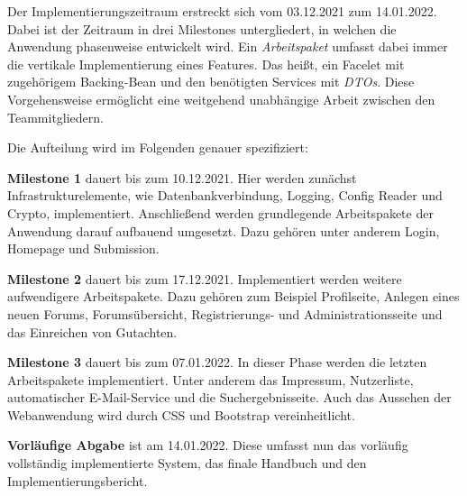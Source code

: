 
Der Implementierungszeitraum erstreckt sich vom 03.12.2021 zum 14.01.2022.
Dabei ist der Zeitraum in drei Milestones untergliedert, in welchen die Anwendung phasenweise entwickelt wird. Ein \emph{Arbeitspaket} umfasst dabei immer die vertikale Implementierung eines Features. Das heißt, ein Facelet mit zugehörigem Backing-Bean und den benötigten Services mit \emph{DTOs}. Diese Vorgehensweise ermöglicht eine weitgehend unabhängige Arbeit zwischen den Teammitgliedern.

Die Aufteilung wird im Folgenden genauer spezifiziert:

\begin{description}
	\item \textbf{Milestone 1} dauert bis zum 10.12.2021. Hier werden zunächst Infrastrukturelemente, wie Datenbankverbindung, Logging, Config Reader und Crypto, implementiert. Anschließend werden grundlegende Arbeitspakete der Anwendung darauf aufbauend umgesetzt. Dazu gehören unter anderem Login, Homepage und Submission.

	\item \textbf{Milestone 2} dauert bis zum 17.12.2021. Implementiert werden weitere aufwendigere Arbeitspakete. Dazu gehören zum Beispiel Profilseite, Anlegen eines neuen Forums, Forumsübersicht, Registrierungs- und Administrationsseite und das Einreichen von Gutachten.

	\item \textbf{Milestone 3} dauert bis zum 07.01.2022. In dieser Phase werden die letzten Arbeitspakete implementiert. Unter anderem das Impressum, Nutzerliste, automatischer E-Mail-Service und die Suchergebnisseite. Auch das Aussehen der Webanwendung wird durch CSS und Bootstrap vereinheitlicht.

	\item \textbf{Vorläufige Abgabe} ist am 14.01.2022. Diese umfasst nun das vorläufig vollständig implementierte System, das finale Handbuch und den Implementierungsbericht.
\end{description}

